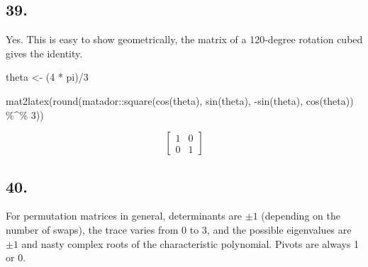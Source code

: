 \documentclass[
]{article}
\newenvironment{Shaded}{\begin{snugshade}}{\end{snugshade}}
\newcommand{\DecValTok}[1]{\textcolor[rgb]{0.69,0.50,0.00}{#1}}
\newcommand{\FunctionTok}[1]{\textcolor[rgb]{0.39,0.29,0.61}{#1}}
\newcommand{\NormalTok}[1]{\textcolor[rgb]{0.12,0.11,0.11}{#1}}
\newcommand{\OtherTok}[1]{\textcolor[rgb]{0.00,0.43,0.16}{#1}}
\newcommand{\SpecialCharTok}[1]{\textcolor[rgb]{0.24,0.68,0.91}{#1}}
\begin{document}
\hypertarget{section-32}{%
\subsection{39.}\label{section-32}}

Yes. This is easy to show geometrically, the matrix of a 120-degree
rotation cubed gives the identity.

\begin{Shaded}
\begin{Highlighting}[]
\NormalTok{theta }\OtherTok{\textless{}{-}}\NormalTok{ (}\DecValTok{4} \SpecialCharTok{*}\NormalTok{ pi)}\SpecialCharTok{/}\DecValTok{3}

\FunctionTok{mat2latex}\NormalTok{(}\FunctionTok{round}\NormalTok{(matador}\SpecialCharTok{::}\FunctionTok{square}\NormalTok{(}\FunctionTok{cos}\NormalTok{(theta), }\FunctionTok{sin}\NormalTok{(theta), }\SpecialCharTok{{-}}\FunctionTok{sin}\NormalTok{(theta),}
    \FunctionTok{cos}\NormalTok{(theta)) }\SpecialCharTok{\%\^{}\%} \DecValTok{3}\NormalTok{))}
\end{Highlighting}
\end{Shaded}

\[
\begin{bmatrix}
1 & 0\\
0 & 1
\end{bmatrix}
\]

\hypertarget{section-33}{%
\subsection{40.}\label{section-33}}

For permutation matrices in general, determinants are \(\pm 1\)
(depending on the number of swaps), the trace varies from 0 to 3, and
the possible eigenvalues are \(\pm1\) and nasty complex roots of the
characteristic polynomial. Pivots are always 1 or 0.
\end{document}
